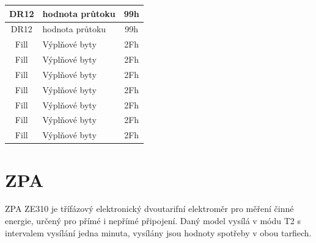 \begin{table}[!ht]
\begin{tabular}{|c|l|c|}
DR12               & hodnota průtoku       & 99h \\ \hline
DR12               & hodnota průtoku       & 99h \\ \hline
Fill               & Výplňové byty         & 2Fh \\ \hline
Fill               & Výplňové byty         & 2Fh \\ \hline
Fill               & Výplňové byty         & 2Fh \\ \hline
Fill               & Výplňové byty         & 2Fh \\ \hline
Fill               & Výplňové byty         & 2Fh \\ \hline
Fill               & Výplňové byty         & 2Fh \\ \hline
Fill               & Výplňové byty         & 2Fh \\ \hline \hline
\end{tabular}%
\end{table}

\newpage
	
	
	\section{ZPA}

ZPA ZE310 je třífázový elektronický dvoutarifní elektroměr pro měření činné energie, určený pro přímé i nepřímé připojení. Daný model vysílá v módu T2 s intervalem vysílání jedna minuta, vysílány jsou hodnoty spotřeby v obou tarfiech.

